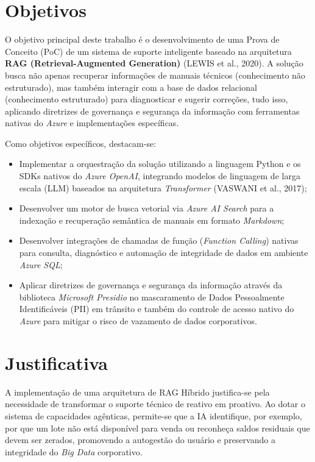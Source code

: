 \section{Objetivos}

O objetivo principal deste trabalho é o desenvolvimento de uma Prova de Conceito (PoC) de um sistema de suporte inteligente baseado na arquitetura \textbf{RAG (Retrieval-Augmented Generation)} (LEWIS et al., 2020). A solução busca não apenas recuperar informações de manuais técnicos (conhecimento não estruturado), mas também interagir com a base de dados relacional (conhecimento estruturado) para diagnosticar e sugerir correções, tudo isso, aplicando diretrizes de governança e segurança da informação com ferramentas nativas do \textit{Azure} e implementações específicas.

Como objetivos específicos, destacam-se:
\begin{itemize}
    \item Implementar a orquestração da solução utilizando a linguagem Python e os SDKs nativos do \textit{Azure OpenAI}, integrando modelos de linguagem de larga escala (LLM) baseados na arquitetura \textit{Transformer} (VASWANI et al., 2017);
    \item Desenvolver um motor de busca vetorial via \textit{Azure AI Search} para a indexação e recuperação semântica de manuais em formato \textit{Markdown};
    \item Desenvolver integrações de chamadas de função (\textit{Function Calling}) nativas para consulta, diagnóstico e automação de integridade de dados em ambiente \textit{Azure SQL};
    \item Aplicar diretrizes de governança e segurança da informação através da biblioteca \textit{Microsoft Presidio} no mascaramento de Dados Pessoalmente Identificáveis (PII) em trânsito e também do controle de acesso nativo do \textit{Azure} para mitigar o risco de vazamento de dados corporativos.
\end{itemize}

\section{Justificativa}

A implementação de uma arquitetura de RAG Híbrido justifica-se pela necessidade de transformar o suporte técnico de reativo em proativo. Ao dotar o sistema de capacidades agênticas, permite-se que a IA identifique, por exemplo, por que um lote não está disponível para venda ou reconheça saldos residuais que devem ser zerados, promovendo a autogestão do usuário e preservando a integridade do \textit{Big Data} corporativo.